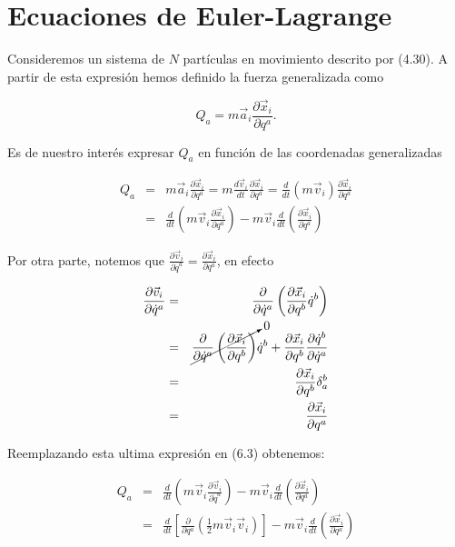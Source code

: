 \documentclass[12pt]{report}
\begin{document}
\section{Ecuaciones de Euler-Lagrange}

Consideremos un sistema de $N$ partículas en movimiento descrito por (4.30). A partir de esta expresión hemos definido la fuerza generalizada como


\begin{equation}
Q_a = m \vec{a}_i \frac{\partial \vec{x}_i}{\partial q^a}.
\end{equation}

Es de nuestro interés expresar $Q_a$ en función de las coordenadas generalizadas 



\begin{eqnarray}
Q_a &=& m \vec{a}_i \frac{\partial \vec{x}_i}{\partial q^a} = m \frac{d\vec{v}_i}{dt} \frac{\partial \vec{x}_i}{\partial q^a} = \frac{d}{dt} \left( m \vec{v}_i \right) \frac{\partial \vec{x}_i}{\partial q^a} \\
&=&\frac{d}{dt} \left( m\vec{v}_i \frac{\partial \vec{x}_i}{\partial q^a}   \right) - m\vec{v}_i \frac{d}{dt} \left( \frac{\partial \vec{x}_i}{\partial q^a} \right)
\end{eqnarray}

Por otra parte, notemos que $\displaystyle \frac{\partial \vec{v}_i}{\partial \dot{q}^a} = \frac{\partial \vec{x}_i}{\partial q^a}$, en efecto



\begin{eqnarray}
\frac{\partial \vec{v}_i}{\partial \dot{q}^a} &=& \frac{\partial}{\partial \dot{q}^a} \left( \frac{\partial \vec{x}_i}{\partial q^b} \dot{q}^b \right) \\
&=& \cancelto{0 }{\frac{\partial}{\partial \dot{q}^a} \left( \frac{\partial \vec{x}_i}{\partial q^b}  \right)} \dot{q}^b + \frac{\partial \vec{x}_i}{\partial q^b} \frac{\partial \dot{q}^b}{\partial \dot{q}^a} \\
&=&\frac{\partial \vec{x}_i}{\partial q^b} \delta^b_{a} \\
&=& \frac{\partial \vec{x}_i}{\partial q^a}
\end{eqnarray} 

Reemplazando esta ultima expresión en (6.3) obtenemos:

\begin{eqnarray}
Q_a&=&\frac{d}{dt} \left( m\vec{v}_i \frac{\partial \vec{v}_i}{\partial \dot{q}^a}   \right) - m\vec{v}_i \frac{d}{dt} \left( \frac{\partial \vec{x}_i}{\partial q^a} \right) \\
&=& \frac{d}{dt} \left[ \frac{\partial}{\partial q^a} \left(\frac{1}{2} m\vec{v}_i \vec{v}_i \right)  \right] - m\vec{v}_i \frac{d}{dt} \left( \frac{\partial \vec{x}_i}{\partial q^a} \right)
\end{eqnarray}
\end{document}
